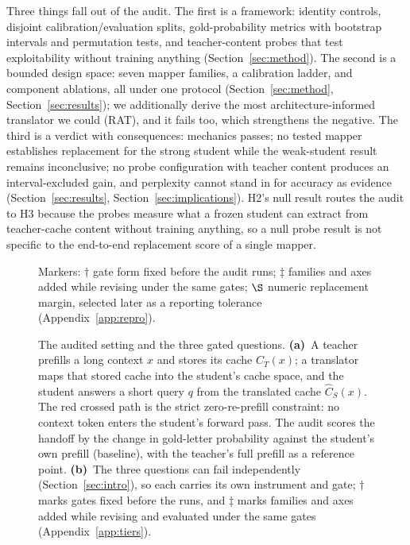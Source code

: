 \documentclass{article} %
\begin{document}
Three things fall out of the audit. The first is a framework: identity
controls, disjoint calibration/evaluation splits, gold-probability metrics
with bootstrap intervals and permutation tests, and teacher-content probes that test
exploitability without training anything (Section~\ref{sec:method}). The
second is a bounded design space: seven mapper families, a calibration ladder,
and component ablations, all under one protocol
(Section~\ref{sec:method}, Section~\ref{sec:results}); we additionally derive
the most architecture-informed translator we could (RAT), and it fails too,
which strengthens the negative. The third is a verdict
with consequences: mechanics passes; no tested mapper establishes replacement
for the strong student while the weak-student result remains inconclusive; no
probe configuration with teacher
content produces an interval-excluded gain, and perplexity
cannot stand in for accuracy as evidence (Section~\ref{sec:results},
Section~\ref{sec:implications}). H2's null result routes the audit to H3
because the probes measure what a frozen student can extract from
teacher-cache content without training anything, so a null probe result is not
specific to the end-to-end replacement score of a single mapper.

\begin{figure}[t]
\centering

\caption{The audited setting and the three gated questions.
\textbf{(a)}~A teacher prefills a long context $x$ and stores its cache
$C_T(x)$; a translator maps that stored cache into the student's cache space,
and the student answers a short query $q$ from the translated cache
$\hat{C}_S(x)$. The red crossed path is the strict zero-re-prefill constraint:
no context token enters the student's forward pass. The audit scores the
handoff by the change in gold-letter probability against the student's own
prefill (baseline), with the teacher's full prefill as a reference
point. \textbf{(b)}~The three questions can fail independently
(Section~\ref{sec:intro}), so each carries its own instrument and gate;
$\dagger$ marks gates fixed before the runs, and $\ddagger$ marks families and
axes added while revising and evaluated under the same gates
(Appendix~\ref{app:tiers}).}
Markers: $\dagger$ gate form fixed before the audit runs; $\ddagger$ families and axes
added while revising under the same gates; $\S$ numeric replacement margin, selected later as a
reporting tolerance (Appendix~\ref{app:repro}).
\label{fig:framework}
\end{figure}
\end{document}
